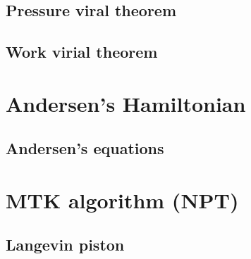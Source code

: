 	\subsection{Pressure viral theorem}

	\subsection{Work virial theorem}

\section{Andersen's Hamiltonian}

	\subsection{Andersen's equations}

\section{MTK algorithm (NPT)}

	\subsection{Langevin piston}
